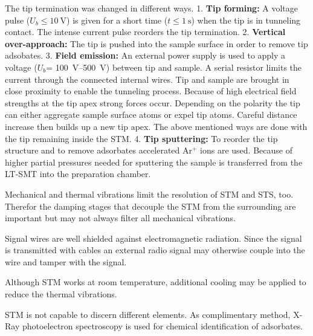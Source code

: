 The tip termination was changed in different ways. 
1. \textbf{Tip forming:} 
		A voltage pulse ($U_b \leq \SI{10}{\volt}$) is given for a short time ($t \leq \SI{1}{\second}$) when the tip is in tunneling contact. The intense current pulse reorders the tip termination.
2. \textbf{Vertical over-approach:}
		The tip is pushed into the sample surface in order to remove tip adsobates.
3. \textbf{Field emission:}
		An external power supply is used to apply a voltage ($U_b$=
		\SIrange{100}{500}{\volt}) between tip and sample. A serial resistor limits the current through the connected internal wires. Tip and sample are brought in close proximity to enable the tunneling process. Because of high electrical field strengths at the tip apex strong forces occur. Depending on the polarity the tip can either aggregate sample surface atoms or expel tip atoms. Careful distance increase then builds up a new tip apex.
The above mentioned ways are done with the tip remaining inside the STM.
4. \textbf{Tip sputtering:}
		To reorder the tip structure and to remove adsorbates accelerated Ar$^+$ ions are used. Because of higher partial pressures needed for sputtering the sample is transferred from the LT-SMT into the preparation chamber.

Mechanical and thermal vibrations limit the resolution of STM and STS, too. Therefor the damping stages that decouple the STM from the surrounding are important but may not always filter all mechanical vibrations. 

Signal wires are well shielded against electromagnetic radiation. Since the signal is transmitted with cables an external radio signal may otherwise couple into the wire and tamper with the signal.

Although STM works at room temperature, additional cooling may be applied to reduce the thermal vibrations.

STM is not capable to discern different elements. As complimentary method, X-Ray photoelectron spectroscopy is used for chemical identification of adsorbates.